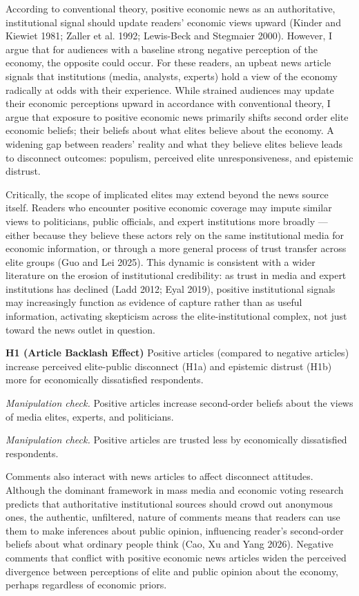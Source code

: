 \documentclass[
  12pt]{article}
\begin{document}
According to conventional theory, positive economic news as an
authoritative, institutional signal should update readers' economic
views upward (Kinder and Kiewiet 1981; {Zaller et al.} 1992; Lewis-Beck
and Stegmaier 2000). However, I argue that for audiences with a baseline
strong negative perception of the economy, the opposite could occur. For
these readers, an upbeat news article signals that institutions (media,
analysts, experts) hold a view of the economy radically at odds with
their experience. While strained audiences may update their economic
perceptions upward in accordance with conventional theory, I argue that
exposure to positive economic news primarily shifts second order elite
economic beliefs; their beliefs about what elites believe about the
economy. A widening gap between readers' reality and what they believe
elites believe leads to disconnect outcomes: populism, perceived elite
unresponsiveness, and epistemic distrust.

Critically, the scope of implicated elites may extend beyond the news
source itself. Readers who encounter positive economic coverage may
impute similar views to politicians, public officials, and expert
institutions more broadly --- either because they believe these actors
rely on the same institutional media for economic information, or
through a more general process of trust transfer across elite groups
(Guo and Lei 2025). This dynamic is consistent with a wider literature
on the erosion of institutional credibility: as trust in media and
expert institutions has declined (Ladd 2012; Eyal 2019), positive
institutional signals may increasingly function as evidence of capture
rather than as useful information, activating skepticism across the
elite-institutional complex, not just toward the news outlet in
question.

\textbf{H1 (Article Backlash Effect)} Positive articles (compared to
negative articles) increase perceived elite-public disconnect (H1a) and
epistemic distrust (H1b) more for economically dissatisfied respondents.

\emph{Manipulation check.} Positive articles increase second-order
beliefs about the views of media elites, experts, and politicians.

\emph{Manipulation check.} Positive articles are trusted less by
economically dissatisfied respondents.

Comments also interact with news articles to affect disconnect
attitudes. Although the dominant framework in mass media and economic
voting research predicts that authoritative institutional sources should
crowd out anonymous ones, the authentic, unfiltered, nature of comments
means that readers can use them to make inferences about public opinion,
influencing reader's second-order beliefs about what ordinary people
think (Cao, Xu and Yang 2026). Negative comments that conflict with
positive economic news articles widen the perceived divergence between
perceptions of elite and public opinion about the economy, perhaps
regardless of economic priors.
\end{document}
